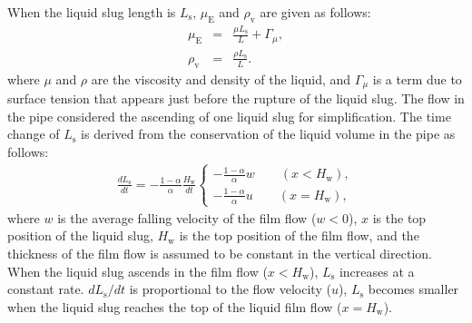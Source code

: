 \documentclass[aps,pre,preprint,groupedaddress,showkeys]{revtex4-2}
\begin{document}
When the liquid slug length is $L_ \mathrm{s}$, $\mu_\mathrm{E}$ and $\rho_\mathrm{v}$ are given as follows:
\begin{eqnarray}
\mu_\mathrm{E} &=& \frac{\mu L_\mathrm{s}}{L} + \Gamma_\mu \label{mue},\\
\rho_\mathrm{v} &=& \frac{\rho L_\mathrm{s}}{L}. \label{rhov}
\end{eqnarray}
where $\mu$ and $\rho$ are the viscosity and density of the liquid, and $\Gamma_ \mu$ is a term due to surface tension that appears just before the rupture of the liquid slug.
The flow in the pipe considered the ascending of one liquid slug for simplification.
The time change of $L_\mathrm{s}$ is derived from the conservation of the liquid volume in the pipe as follows:
\begin{eqnarray}
\frac{dL_\mathrm{s}}{dt}= - \frac{1-\alpha}{\alpha} \frac{H_\mathrm{w}}{dt} \left\{
  \begin{array}{ll}
  -\frac{1-\alpha}{\alpha} w \qquad (x<H_\mathrm{w}), \\
   -\frac{1-\alpha}{\alpha} u \qquad (x=H_\mathrm{w}),
  \end{array}
  \right. 
  \label{dLdt}
\end{eqnarray}
where $ w $ is the average falling velocity of the film flow ($ w <0 $), $ x $ is the top position of the liquid slug, $ H_ \mathrm {w} $ is the top position of the film flow, and the thickness of the film flow is assumed to be constant in the vertical direction.
When the liquid slug ascends in the film flow ($ x <H_ \mathrm{w} $), $ L_ \mathrm{s} $ increases at a constant rate.
$ dL_ \mathrm{s} / dt $ is proportional to the flow velocity ($ u $), $ L_ \mathrm{s} $ becomes smaller when the liquid slug reaches the top of the liquid film flow ($ x = H_ \mathrm{w}$).
\end{document}
